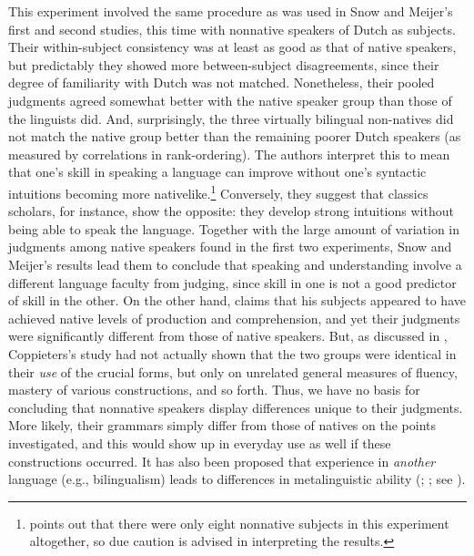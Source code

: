 This experiment involved the same procedure as was used in Snow and Meijer's first and second studies, this time with nonnative speakers of Dutch as subjects. Their within-subject consistency was at least as good as that of native speakers, but predictably they showed more between-subject disagreements, since their degree of familiarity with Dutch was not matched. Nonetheless, their pooled judgments agreed somewhat better with the native speaker group than those of the linguists did. And, surprisingly, the three virtually bilingual non-natives did not match the native group better than the remaining poorer Dutch speakers (as measured by correlations in rank-ordering). The authors interpret this to mean that one's skill in speaking a language can improve without one's syntactic intuitions becoming more nativelike.\footnote{\citet{Chaudron1983} points out that there were only eight nonnative subjects in this experiment altogether, so due caution is advised in interpreting the results.}
 Conversely, they suggest that classics scholars, for instance, show the opposite: they develop strong intuitions without being able to speak the language. Together with the large amount of variation in judgments among native speakers found in the first two experiments, Snow and Meijer's results lead them to conclude that speaking and understanding involve a different language faculty from judging, since skill in one is not a good predictor of skill in the other. On the other hand, \citet{Coppieters1987} claims that his subjects appeared to have achieved native levels of production and comprehension, and yet their judgments were significantly different from those of native speakers. But, as discussed in , Coppieters's study had not actually shown that the two groups were identical in their \textit{use} of the crucial forms, but only on unrelated general measures of fluency, mastery of various constructions, and so forth. Thus, we have no basis for concluding that nonnative speakers display differences unique to their judgments. More likely, their grammars simply differ from those of natives on the points investigated, and this would show up in everyday use as well if these constructions occurred. It has also been proposed that experience in \textit{another} language (e.g., bilingualism) leads to differences in metalinguistic ability (\citealt{VanKleeck1982}; \citealt{Bialystok1986}; see ).

